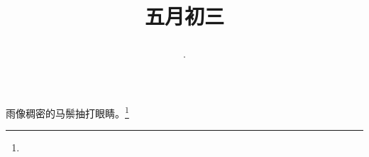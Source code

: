 \title{\date[d=8,m=6,y=2024][year:cn-y,年,month:cn,day:cn,日,·,weekday]·五月初三 }
雨像稠密的马鬃抽打眼睛。\footnote{ }

